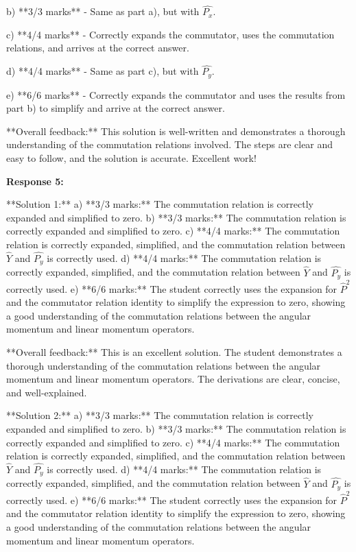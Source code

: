 \documentclass[a4paper,11pt]{article}
\begin{document}
b) **3/3 marks** - Same as part a), but with \( \hat{P_x} \).

c) **4/4 marks** - Correctly expands the commutator, uses the commutation relations, and arrives at the correct answer.

d) **4/4 marks** - Same as part c), but with \( \hat{P_y} \).

e) **6/6 marks** - Correctly expands the commutator and uses the results from part b) to simplify and arrive at the correct answer.

**Overall feedback:** This solution is well-written and demonstrates a thorough understanding of the commutation relations involved. The steps are clear and easy to follow, and the solution is accurate. Excellent work!


\textbf{Response 5:}

**Solution 1:**
a) **3/3 marks:** The commutation relation is correctly expanded and simplified to zero.
b) **3/3 marks:** The commutation relation is correctly expanded and simplified to zero.
c) **4/4 marks:** The commutation relation is correctly expanded, simplified, and the commutation relation between \( \hat{Y} \) and \( \hat{P_{y}} \) is correctly used.
d) **4/4 marks:** The commutation relation is correctly expanded, simplified, and the commutation relation between \( \hat{Y} \) and \( \hat{P_{y}} \) is correctly used.
e) **6/6 marks:** The student correctly uses the expansion for \( \hat{P}^{2} \) and the commutator relation identity to simplify the expression to zero, showing a good understanding of the commutation relations between the angular momentum and linear momentum operators. 

**Overall feedback:** This is an excellent solution. The student demonstrates a thorough understanding of the commutation relations between the angular momentum and linear momentum operators. The derivations are clear, concise, and well-explained.

**Solution 2:**
a) **3/3 marks:** The commutation relation is correctly expanded and simplified to zero.
b) **3/3 marks:** The commutation relation is correctly expanded and simplified to zero.
c) **4/4 marks:** The commutation relation is correctly expanded, simplified, and the commutation relation between \( \hat{Y} \) and \( \hat{P_{y}} \) is correctly used.
d) **4/4 marks:** The commutation relation is correctly expanded, simplified, and the commutation relation between \( \hat{Y} \) and \( \hat{P_{y}} \) is correctly used.
e) **6/6 marks:** The student correctly uses the expansion for \( \hat{P}^{2} \) and the commutator relation identity to simplify the expression to zero, showing a good understanding of the commutation relations between the angular momentum and linear momentum operators.
\end{document}
